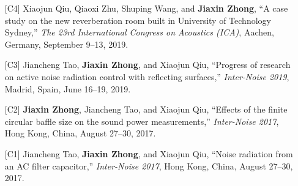 \documentclass[10pt,a4paper,ragged2e,withhyper]{altacv}
\newcommand{\PubConference}[1]{\textit{#1}}
\newcommand{\PubTitle}[1]{``{#1,}''}
\newcommand{\PubMe}[1]{\textbf{#1}}
\begin{document}
\begin{itemize}[leftmargin = 25pt]
    \item[{[C4]}] Xiaojun Qiu, Qiaoxi Zhu, Shuping Wang, and \PubMe{Jiaxin Zhong},
        \PubTitle{A case study on the new reverberation room built in University of Technology Sydney}
        \PubConference{The 23rd International Congress on Acoustics (ICA)},
        Aachen, Germany, 
        September 9--13, 2019.
        \href{https://github.com/JiaxinZhong/JiaxinZhong.github.io/raw/master/publications/conference/Qiu2019-ICA-Reverberation_room_UTS.pdf}{\color{accent}\faFilePdf[regular]}

    \item[{[C3]}] Jiancheng Tao, \PubMe{Jiaxin Zhong}, and Xiaojun Qiu,
        \PubTitle{Progress of research on active noise radiation control with reflecting surfaces}
        \PubConference{Inter-Noise 2019},
        Madrid, Spain, 
        June 16--19, 2019.
        \href{https://github.com/JiaxinZhong/JiaxinZhong.github.io/raw/master/publications/conference/Tao2019-Internoise-ANC_surface.pdf}{\color{accent}\faFilePdf[regular]}

    \item[{[C2]}] \PubMe{Jiaxin Zhong}, Jiancheng Tao, and Xiaojun Qiu,
        \PubTitle{Effects of the finite circular baffle size on the sound power measurements}
        \PubConference{Inter-Noise 2017},
        Hong Kong, China, 
        August 27--30, 2017.
        \href{https://github.com/JiaxinZhong/JiaxinZhong.github.io/raw/master/publications/conference/Zhong2017-InterNoise-Sound_power_measurement.pdf}{\color{accent}\faFilePdf[regular]}
    
    \item[{[C1]}] Jiancheng Tao, \PubMe{Jiaxin Zhong}, and Xiaojun Qiu,
        \PubTitle{Noise radiation from an AC filter capacitor}
        \PubConference{Inter-Noise 2017},
        Hong Kong, China, 
        August 27--30, 2017.
        \href{https://github.com/JiaxinZhong/JiaxinZhong.github.io/raw/master/publications/conference/Tao2017-Internoise-AC_capacitor.pdf}{\color{accent}\faFilePdf[regular]}
\end{itemize}

\end{document}
